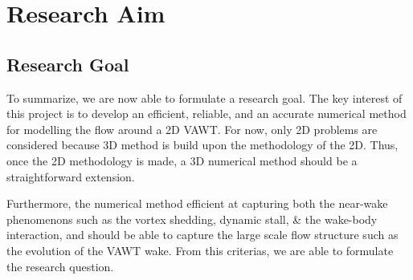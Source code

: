 \section{Research Aim}



\subsection*{Research Goal}
To summarize, we are now able to formulate a research goal. The key interest of this project is to develop an efficient, reliable, and an accurate numerical method for modelling the flow around a 2D VAWT. For now, only 2D problems are considered because 3D method is build upon the methodology of the 2D. Thus, once the 2D methodology is made, a 3D numerical method should be a straightforward extension.

Furthermore, the numerical method efficient at capturing both the near-wake phenomenons such as the vortex shedding, dynamic stall, \& the wake-body interaction, and should be able to capture the large scale flow structure such as the evolution of the VAWT wake. From this criterias, we are able to formulate the research question.

